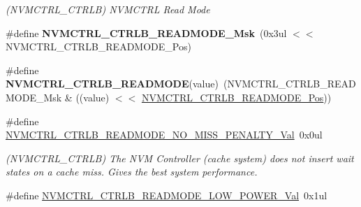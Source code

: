 \begin{DoxyCompactItemize}
\begin{DoxyCompactList}\small\item\em (N\+V\+M\+C\+T\+R\+L\+\_\+\+C\+T\+R\+L\+B) N\+V\+M\+C\+T\+R\+L Read Mode \end{DoxyCompactList}\item 
\hypertarget{group___s_a_m_l21___n_v_m_c_t_r_l_ga1a5b8a600e2d62a49984a1c75ea693a2}{}\#define {\bfseries N\+V\+M\+C\+T\+R\+L\+\_\+\+C\+T\+R\+L\+B\+\_\+\+R\+E\+A\+D\+M\+O\+D\+E\+\_\+\+Msk}~(0x3ul $<$$<$ N\+V\+M\+C\+T\+R\+L\+\_\+\+C\+T\+R\+L\+B\+\_\+\+R\+E\+A\+D\+M\+O\+D\+E\+\_\+\+Pos)\label{group___s_a_m_l21___n_v_m_c_t_r_l_ga1a5b8a600e2d62a49984a1c75ea693a2}

\item 
\hypertarget{group___s_a_m_l21___n_v_m_c_t_r_l_gaaa05ed9df2291f44b919f5b0fa447767}{}\#define {\bfseries N\+V\+M\+C\+T\+R\+L\+\_\+\+C\+T\+R\+L\+B\+\_\+\+R\+E\+A\+D\+M\+O\+D\+E}(value)~(N\+V\+M\+C\+T\+R\+L\+\_\+\+C\+T\+R\+L\+B\+\_\+\+R\+E\+A\+D\+M\+O\+D\+E\+\_\+\+Msk \& ((value) $<$$<$ \hyperlink{group___s_a_m_l21___n_v_m_c_t_r_l_ga46b5014db97bf5ce4da54dce52d162f9}{N\+V\+M\+C\+T\+R\+L\+\_\+\+C\+T\+R\+L\+B\+\_\+\+R\+E\+A\+D\+M\+O\+D\+E\+\_\+\+Pos}))\label{group___s_a_m_l21___n_v_m_c_t_r_l_gaaa05ed9df2291f44b919f5b0fa447767}

\item 
\hypertarget{group___s_a_m_l21___n_v_m_c_t_r_l_ga4a4b96f2109c47245bc98e69b66fff74}{}\#define \hyperlink{group___s_a_m_l21___n_v_m_c_t_r_l_ga4a4b96f2109c47245bc98e69b66fff74}{N\+V\+M\+C\+T\+R\+L\+\_\+\+C\+T\+R\+L\+B\+\_\+\+R\+E\+A\+D\+M\+O\+D\+E\+\_\+\+N\+O\+\_\+\+M\+I\+S\+S\+\_\+\+P\+E\+N\+A\+L\+T\+Y\+\_\+\+Val}~0x0ul\label{group___s_a_m_l21___n_v_m_c_t_r_l_ga4a4b96f2109c47245bc98e69b66fff74}

\begin{DoxyCompactList}\small\item\em (N\+V\+M\+C\+T\+R\+L\+\_\+\+C\+T\+R\+L\+B) The N\+V\+M Controller (cache system) does not insert wait states on a cache miss. Gives the best system performance. \end{DoxyCompactList}\item 
\hypertarget{group___s_a_m_l21___n_v_m_c_t_r_l_gaa992cf03ba51b466d0e1f18fba2982d2}{}\#define \hyperlink{group___s_a_m_l21___n_v_m_c_t_r_l_gaa992cf03ba51b466d0e1f18fba2982d2}{N\+V\+M\+C\+T\+R\+L\+\_\+\+C\+T\+R\+L\+B\+\_\+\+R\+E\+A\+D\+M\+O\+D\+E\+\_\+\+L\+O\+W\+\_\+\+P\+O\+W\+E\+R\+\_\+\+Val}~0x1ul\label{group___s_a_m_l21___n_v_m_c_t_r_l_gaa992cf03ba51b466d0e1f18fba2982d2}


\end{DoxyCompactItemize}
